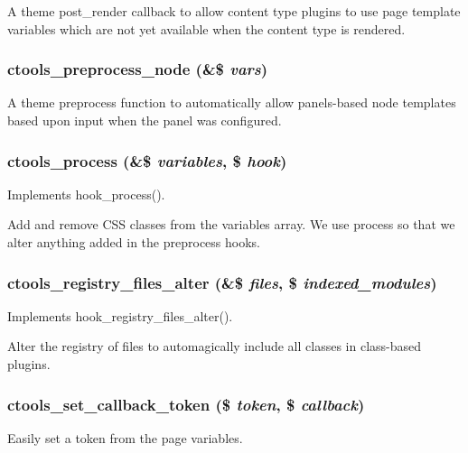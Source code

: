 \label{ctools_8module_ada3893e7993e19022048e2b47b413baa}
A theme post\_\-render callback to allow content type plugins to use page template variables which are not yet available when the content type is rendered. \hypertarget{ctools_8module_aacda26406250e7a22dbfce3c95e8a364}{
\subsubsection[{ctools\_\-preprocess\_\-node}]{\setlength{\rightskip}{0pt plus 5cm}ctools\_\-preprocess\_\-node (\&\$ {\em vars})}}
\label{ctools_8module_aacda26406250e7a22dbfce3c95e8a364}
A theme preprocess function to automatically allow panels-\/based node templates based upon input when the panel was configured. \hypertarget{ctools_8module_a2f9ba929f2bd627113c551823ac43afc}{
\subsubsection[{ctools\_\-process}]{\setlength{\rightskip}{0pt plus 5cm}ctools\_\-process (\&\$ {\em variables}, \/  \$ {\em hook})}}
\label{ctools_8module_a2f9ba929f2bd627113c551823ac43afc}
Implements hook\_\-process().

Add and remove CSS classes from the variables array. We use process so that we alter anything added in the preprocess hooks. \hypertarget{ctools_8module_ae64a38f412c2d9b9892b29551c27f104}{
\subsubsection[{ctools\_\-registry\_\-files\_\-alter}]{\setlength{\rightskip}{0pt plus 5cm}ctools\_\-registry\_\-files\_\-alter (\&\$ {\em files}, \/  \$ {\em indexed\_\-modules})}}
\label{ctools_8module_ae64a38f412c2d9b9892b29551c27f104}
Implements hook\_\-registry\_\-files\_\-alter().

Alter the registry of files to automagically include all classes in class-\/based plugins. \hypertarget{ctools_8module_a75a083090c8f72d76a9e6378a911bc50}{
\subsubsection[{ctools\_\-set\_\-callback\_\-token}]{\setlength{\rightskip}{0pt plus 5cm}ctools\_\-set\_\-callback\_\-token (\$ {\em token}, \/  \$ {\em callback})}}
\label{ctools_8module_a75a083090c8f72d76a9e6378a911bc50}
Easily set a token from the page variables.

